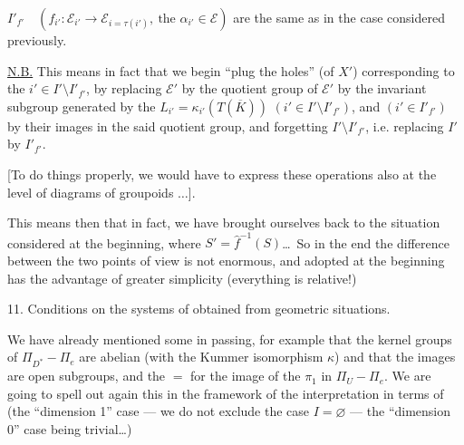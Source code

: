 
\(I'_{f'}\quad (f_{i'}:\mathcal E_{i'}\longrightarrow
\mathcal E_{i=\tau(i')},\ \text{the }\alpha_{i'}\in\mathcal E)\)
are the same as in the case considered previously.

\uline{N.B.} This means in fact that we begin  ``plug the holes'' 
(of \(X'\)) corresponding to the \(i'\in I'\setminus I'_{f'}\), by replacing
\(\mathcal E'\) by the quotient group of \(\mathcal E'\)
by the invariant subgroup generated by the
\(L_{i'}=\kappa_{i'}(T(\overline K))\)
\((i'\in I'\setminus I'_{f'})\), and  
\((i'\in I'_{f'})\) by their images in the said quotient group, and forgetting
 \(I'\setminus I'_{f'}\), i.e. replacing \(I'\) by \(I'_{f'}\).

[To do things properly, we would have to express these operations also at the level of diagrams
of groupoids
\(\ldots\)].


This means then that in fact, we have brought ourselves back to the situation considered at the beginning,
where \(S'=\widehat f^{-1}(S)\)\ldots\ So in the end
the difference between the two points of view is not enormous, and
 adopted at the beginning has the advantage of
greater simplicity (everything is relative!)



11. Conditions on the systems of 
obtained from geometric situations.

We have already mentioned some in passing, for example that the kernel groups of
\(\Pi_{D^*}-\Pi_e\) are abelian (with the Kummer isomorphism \(\kappa\))
and that the images are open subgroups, and the \(=\) for
the image of the  \(\pi_1\) in \(\Pi_U-\Pi_e\).
We are going to spell out again  this in the framework of the interpretation
in terms of
(the ``dimension 1'' case --- we do not exclude the case \(I=\varnothing\) ---
the ``dimension 0'' case being trivial\ldots)

